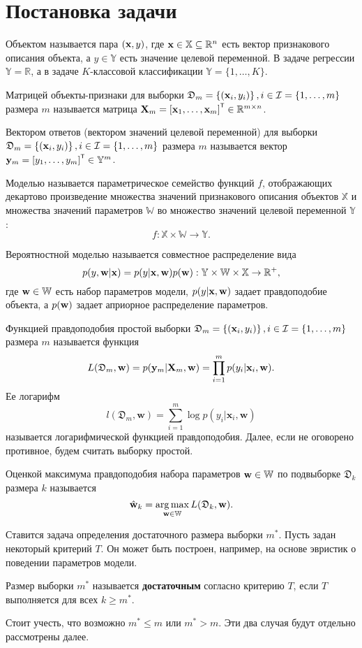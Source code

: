 \section{Постановка задачи}\label{sec1}

Объектом называется пара $(\mathbf{x}, y)$, где $\mathbf{x} \in \mathbb{X} \subseteq \mathbb{R}^n$ есть вектор признакового описания объекта, а $y \in \mathbb{Y}$ есть значение целевой переменной. В задаче регрессии $\mathbb{Y} = \mathbb{R}$, а в задаче $K$-классовой классификации $\mathbb{Y} = \{1, \ldots, K\}$.

Матрицей объекты-признаки для выборки $\mathfrak{D}_m = \left\{ (\mathbf{x}_i, y_i) \right\}, i \in \mathcal{I} = \{ 1, \ldots, m \}$ размера $m$ называется матрица $\bX_m = \left[ \bx_1, \ldots, \bx_m \right]\T \in \mathbb{R}^{m \times n}$.

Вектором ответов (вектором значений целевой переменной) для выборки $\mathfrak{D}_m = \left\{ (\mathbf{x}_i, y_i) \right\}, i \in \mathcal{I} = \{ 1, \ldots, m \}$ размера $m$ называется вектор $\by_m = \left[ y_1, \ldots, y_m \right]\T \in \mathbb{Y}^m$.

Моделью называется параметрическое семейство функций $f$, отображающих декартово произведение множества значений признакового описания объектов $\mathbb{X}$ и множества значений параметров $\mathbb{W}$ во множество значений целевой переменной $\mathbb{Y}$: 
\[ f: \mathbb{X} \times \mathbb{W} \to \mathbb{Y}. \]

Вероятностной моделью называется совместное распределение вида 
\[ p(y, \mathbf{w} | \mathbf{x}) = p(y | \mathbf{x}, \mathbf{w}) p(\mathbf{w}): \mathbb{Y} \times \mathbb{W} \times \mathbb{X} \to \mathbb{R}^+, \]
где $\mathbf{w} \in \mathbb{W}$ есть набор параметров модели, $p(y | \mathbf{x}, \mathbf{w})$ задает правдоподобие объекта, а $p(\mathbf{w})$ задает априорное распределение параметров.

Функцией правдоподобия простой выборки $\mathfrak{D}_m = \left\{ (\mathbf{x}_i, y_i) \right\}, i \in \mathcal{I} = \{ 1, \ldots, m \}$ размера $m$ называется функция 
\[ L(\mathfrak{D}_m, \mathbf{w}) = p(\mathbf{y}_m | \mathbf{X}_m, \mathbf{w}) = \prod_{i=1}^{m} p(y_i | \mathbf{x}_i, \mathbf{w}). \]
Ее логарифм 
\[ l(\mathfrak{D}_m, \mathbf{w}) = \sum\limits_{i=1}^{m} \log p(y_i | \mathbf{x}_i, \mathbf{w}) \]
называется логарифмической функцией правдоподобия. Далее, если не оговорено противное, будем считать выборку простой.

Оценкой максимума правдоподобия набора параметров $\mathbf{w} \in \mathbb{W}$ по подвыборке $\mathfrak{D}_k$ размера $k$ называется 
\[ \hat{\mathbf{w}}_{k} = \operatorname*{arg\,max}_{\mathbf{w} \in \mathbb{W}} L(\mathfrak{D}_k, \mathbf{w}). \]

Ставится задача определения достаточного размера выборки $m^*$. Пусть задан некоторый критерий $T$. Он может быть построен, например, на основе эвристик о поведении параметров модели.
\begin{definition}
    Размер выборки $m^*$ называется \textbf{достаточным} согласно критерию $T$, если $T$ выполняется для всех $k \geqslant m^*$.
\end{definition}
Стоит учесть, что возможно $m^* \leqslant m$ или $m^* > m$. Эти два случая будут отдельно рассмотрены далее.